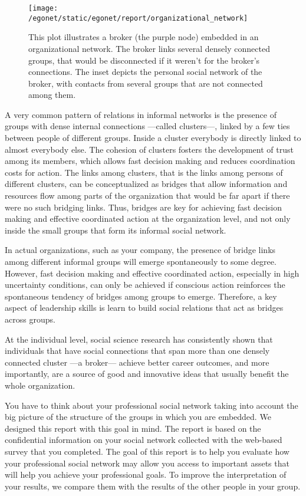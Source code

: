 \documentclass[a4paper,12pt]{article}
\begin{document}
\begin{figure}[H]
\centering
\texttt{[image: /egonet/static/egonet/report/organizational\_network]}
\caption{This plot illustrates a broker (the purple node) embedded in an organizational network. The broker links several densely connected groups, that would be disconnected if it weren't for the broker's connections. The inset depicts the personal social network of the broker, with contacts from several groups that are not connected among them.}
\end{figure}


A very common pattern of relations in informal networks is the presence of groups with dense internal connections ---called clusters---, linked by a few ties between people of different groups. Inside a cluster everybody is directly linked to almost everybody else. The cohesion of clusters fosters the development of trust among its members, which allows fast decision making and reduces coordination costs for action. The links among clusters, that is the links among persons of different clusters, can be conceptualized as bridges that allow information and resources flow among parts of the organization that would be far apart if there were no such bridging links. Thus, bridges are key for achieving fast decision making and effective coordinated action at the organization level, and not only inside the small groups that form its informal social network.

In actual organizations, such as your company, the presence of bridge links among different informal groups will emerge spontaneously to some degree. However, fast decision making and effective coordinated action, especially in high uncertainty conditions, can only be achieved if conscious action reinforces the spontaneous tendency of bridges among groups to emerge. Therefore, a key aspect of leadership skills is learn to build social relations that act as bridges across groups.

At the individual level, social science research has consistently shown that individuals that have social connections that span more than one densely connected cluster ---a broker--- achieve better career outcomes, and more importantly, are a source of good and innovative ideas that usually benefit the whole organization.

You have to think about your professional social network taking into account the big picture of the structure of the groups in which you are embedded. We designed this report with this goal in mind. The report is based on the confidential information on your social network collected with the web-based survey that you completed. The goal of this report is to help you evaluate how your professional social network may allow you access to important assets that will help you achieve your professional goals. To improve the interpretation of your results, we compare them with the results of the other people in your group.
\end{document}

